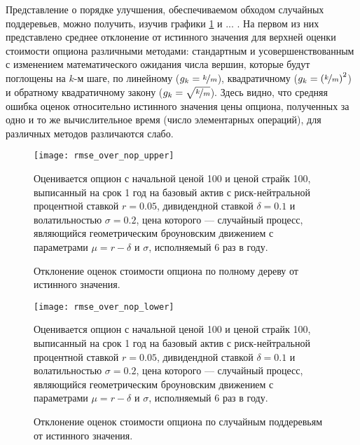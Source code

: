 Представление о порядке улучшения, обеспечиваемом обходом случайных поддеревьев, можно получить, изучив графики \ref{fig:rmse_over_nop_upper} и ... . На первом из них представлено среднее отклонение от истинного значения для верхней оценки стоимости опциона различными методами: стандартным и усовершенствованным с изменением математического ожидания числа вершин, которые будут поглощены на $k$-м шаге, по линейному ($g_k = \nicefrac{k}{m}$), квадратичному ($g_k = \left(\nicefrac{k}{m}\right)^2$) и обратному квадратичному закону ($g_k = \sqrt{\nicefrac{k}{m}}$). Здесь видно, что средняя ошибка оценок относительно истинного значения цены опциона, полученных за одно и то же вычислительное время (число элементарных операций), для различных методов различаются слабо. 
\begin{figure}%
    \centering
	\texttt{[image: rmse\_over\_nop\_upper]}
	\caption{Отклонение оценок стоимости опциона по полному дереву от истинного значения.}
	\label{fig:rmse_over_nop_upper}
	\footnotesize{Оценивается опцион с начальной ценой 100 и ценой страйк 100, выписанный на срок 1 год на базовый актив с риск-нейтральной процентной ставкой $r = 0.05$, дивидендной ставкой $\delta = 0.1$ и волатильностью $\sigma=0.2$, цена которого --- случайный процесс, являющийся геометрическим броуновским движением с параметрами $\mu = r - \delta$ и $\sigma$, исполняемый 6 раз в году.}
\end{figure}
\begin{figure}%
    \centering
	\texttt{[image: rmse\_over\_nop\_lower]}
	\caption{Отклонение оценок стоимости опциона по случайным поддеревьям от истинного значения.}
	\label{fig:rmse_over_nop_lower}
	\footnotesize{Оценивается опцион с начальной ценой 100 и ценой страйк 100, выписанный на срок 1 год на базовый актив с риск-нейтральной процентной ставкой $r = 0.05$, дивидендной ставкой $\delta = 0.1$ и волатильностью $\sigma=0.2$, цена которого --- случайный процесс, являющийся геометрическим броуновским движением с параметрами $\mu = r - \delta$ и $\sigma$, исполняемый 6 раз в году.}
\end{figure}
